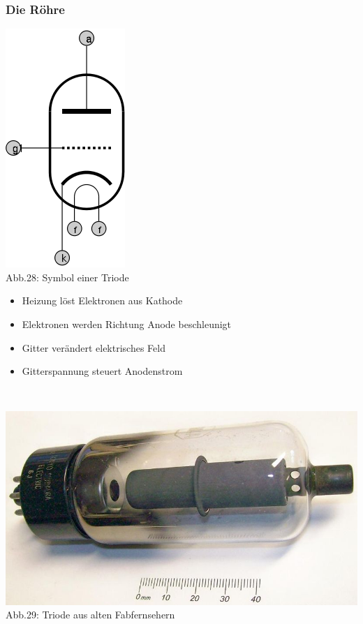 \begin{frame}
\frametitle{Die Röhre}
\begin{minipage}{0.3\textwidth}
	\includegraphics[scale=0.35]{a06/ERohre.png}\\
	Abb.28: Symbol einer Triode \cite{wp}
\end{minipage}
\hspace{0.5cm}
\begin{minipage}{0.5\textwidth}
\begin{small}
	\begin{itemize}
		\item Heizung löst Elektronen aus Kathode
		\item Elektronen werden Richtung Anode beschleunigt
		\item Gitter verändert elektrisches Feld
		\item Gitterspannung steuert Anodenstrom
	\end{itemize}
	\end{small}
\end{minipage}\\
\begin{center}
\includegraphics[scale=0.4 ]{a06/Triode.jpg}\\
	Abb.29: Triode aus alten Fabfernsehern \cite{wp}
\end{center}
\end{frame}


